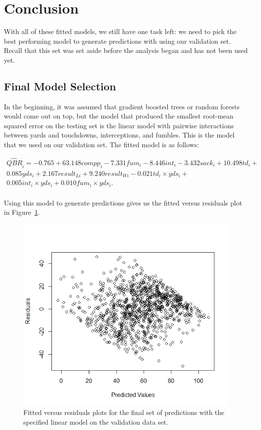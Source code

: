 \documentclass[12pt]{article}\usepackage[]{graphicx}\usepackage[]{color}
\begin{document}
\section{Conclusion}
With all of these fitted models, we still have one task left: we need to pick the best performing model to generate predictions with using our validation set. Recall that this set was set aside before the analysis began and has not been used yet.

\subsection{Final Model Selection}
In the beginning, it was assumed that gradient boosted trees or random forests would come out on top, but the model that produced the smallest root-mean squared error on the testing set is the linear model with pairwise interactions between yards and touchdowns, interceptions, and fumbles. This is the model that we used on our validation set. The fitted model is as follows:

\begin{multline*}
\widehat{QBR}_{i}=-0.765+63.148compp_{i}-7.331fum_{i}-8.446int_{i}-3.432sack_{i}+10.498td_{i}+\\
0.085yds_{i}+2.167result_{Li}+9.240result_{Wi}-0.021td_{i}\times yds_{i}+\\
0.005int_{i}\times yds_{i}+0.010fum_{i}\times yds_{i}.\\
\end{multline*}

Using this model to generate predictions gives us the fitted versus residuals plot in Figure~\ref{fig:finally}.

\begin{figure}[h]
	\centering
	\includegraphics[width=\textwidth]{finally.jpeg}
	\captionsetup{font=footnotesize,labelfont=footnotesize}
	\caption{\label{fig:finally} Fitted versus residuals plots for the final set of predictions with the specified linear model on the validation data set.}
\end{figure}
\end{document}
